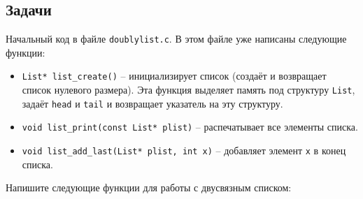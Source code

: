 \documentclass{article}
\begin{document}
\newpage
\subsection*{Задачи}
Начальный код в файле \texttt{doublylist.c}. В этом файле уже написаны следующие функции:
\begin{itemize}
\item \texttt{List* list\_create()} -- инициализирует список (создаёт и возвращает список нулевого размера). Эта функция выделяет память под структуру \texttt{List}, задаёт \texttt{head} и \texttt{tail} и возвращает указатель на эту структуру.
\item \texttt{void list\_print(const List* plist)} -- распечатывает все элементы списка.
\item \texttt{void list\_add\_last(List* plist, int x)} -- добавляет элемент \texttt{x} в конец списка.
\end{itemize}
Напишите следующие функции для работы с двусвязным списком:
\end{document}

